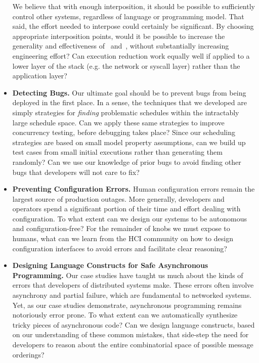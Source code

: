 \begin{itemize}
We believe that with enough interposition, it should be possible to
sufficiently control other systems, regardless of language or
programming model. That said, the effort needed to interpose could certainly be
significant. By choosing appropriate interposition points, would it be
possible to increase the generality and effectiveness of
\projectname~and~\sys, without substantially increasing engineering effort?
Can execution reduction work equally well if applied to a lower layer of the
stack (e.g.
the network or syscall layer) rather than the application layer?

\item \textbf{Detecting Bugs.} Our ultimate goal should be to prevent bugs
from being deployed in the first place. In a sense, the techniques
that we developed are simply strategies for \textit{finding}
problematic schedules
within the intractably large schedule space. Can we apply these same
strategies to improve concurrency testing, before debugging takes place? Since our
scheduling strategies are based on small model property assumptions, can we build
up test cases from small initial executions rather than generating them randomly?
Can we use our knowledge of prior bugs to avoid finding other bugs that
developers will not care to fix?

\item \textbf{Preventing Configuration Errors.} Human configuration errors
remain the largest source of production outages.
More generally, developers and operators spend a significant portion of their time and effort dealing with configuration.
To what extent can we design our systems to be autonomous and configuration-free? For the remainder of knobs we must
expose to humans, what can we learn from the HCI community on how to design configuration interfaces to avoid errors and facilitate clear reasoning?

\item \textbf{Designing Language Constructs for Safe Asynchronous
Programming.} Our case studies have taught us much about the kinds of errors
that developers of distributed systems make. These errors often involve
asynchrony and partial failure, which  are fundamental to networked systems.
Yet, as our case studies demonstrate, asynchronous programming remains
notoriously error prone. To what extent can we automatically synthesize tricky
pieces of asynchronous code? Can we design language constructs, based on our
understanding of these common mistakes, that side-step the need for developers to reason about the entire combinatorial space of possible message orderings?

\end{itemize}

